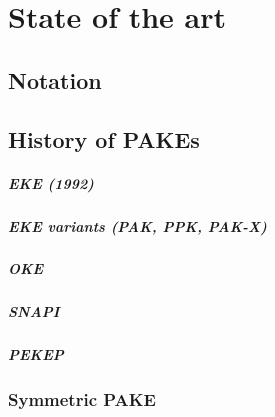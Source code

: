 \documentclass[../report.tex]{subfiles}
\begin{document}




\chapter{State of the art}

\section{Notation}

\section{History of PAKEs}

\paragraph{EKE (1992)}
\paragraph{EKE variants (PAK, PPK, PAK-X)}
\paragraph{OKE}
\paragraph{SNAPI}
\paragraph{PEKEP}
\subsection{Symmetric PAKE}
\end{document}
